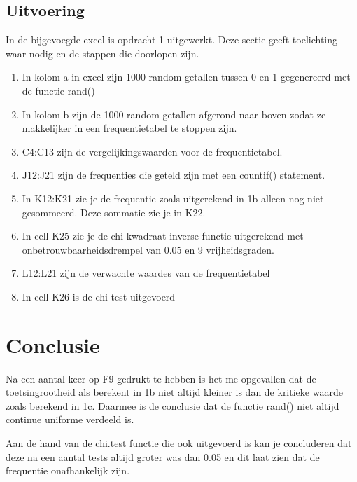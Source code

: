 \documentclass{article}
\begin{document}
\newpage
\subsection{Uitvoering}
\label{subsec:sample_uitv}

In de bijgevoegde excel is opdracht 1 uitgewerkt. Deze sectie geeft toelichting waar nodig en de stappen die doorlopen zijn.

\begin{enumerate}
\item In kolom a in excel zijn 1000 random getallen tussen 0 en 1 gegenereerd met de functie rand()
\item In kolom b zijn de 1000 random getallen afgerond naar boven zodat ze makkelijker in een frequentietabel te stoppen zijn.
\item C4:C13 zijn de vergelijkingswaarden voor de frequentietabel.
\item J12:J21 zijn de frequenties die geteld zijn met een countif() statement. 
\item In K12:K21 zie je de frequentie zoals uitgerekend in 1b alleen nog niet gesommeerd. Deze sommatie zie je in K22. 
\item In cell K25 zie je de chi kwadraat inverse functie uitgerekend met onbetrouwbaarheidsdrempel van 0.05 en 9 vrijheidsgraden.
\item L12:L21 zijn de verwachte waardes van de frequentietabel
\item In cell K26 is de chi test uitgevoerd
\end{enumerate}

\section{Conclusie}
\label{subsec:sample_con}

Na een aantal keer op F9 gedrukt te hebben is het me opgevallen dat de toetsingrootheid als berekent in 1b niet altijd kleiner is dan de kritieke waarde zoals berekend in 1c. Daarmee is de conclusie dat de functie rand() niet altijd continue uniforme verdeeld is.

Aan de hand van de chi.test functie die ook uitgevoerd is kan je concluderen dat deze na een aantal tests altijd groter was dan 0.05 en dit laat zien dat de frequentie onafhankelijk zijn.
\end{document}
